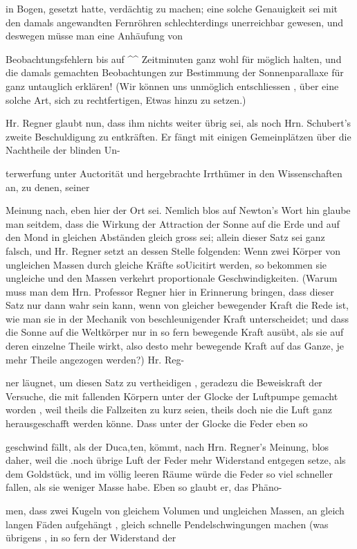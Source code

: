 \documentclass[10pt,a4paper]{article}
\begin{document}
in Bogen, gesetzt hatte, verdächtig zu machen; eine solche Genauigkeit sei mit den damals angewandten Fernröhren schlechterdings unerreichbar gewesen, und deswegen müsse man eine Anhäufung von

Beobachtungsfehlern bis auf \textasciicircum{}\textasciicircum{} Zeitminuten ganz wohl für möglich halten, und die damals gemachten Beobachtungen zur Bestimmung der Sonnenparallaxe für ganz untauglich erklären! (Wir können uns unmöglich entschliessen , über eine solche Art, sich zu rechtfertigen, Etwas hinzu zu setzen.)

Hr. Regner glaubt nun, dass ihm nichts weiter übrig sei, als noch Hrn. Schubert's zweite Beschuldigung zu entkräften. Er fängt mit einigen Gemeinplätzen über die Nachtheile der blinden Un-

terwerfung unter Auctorität und hergebrachte Irrthümer in den Wissenschaften an, zu denen, seiner

Meinung nach, eben hier der Ort sei. Nemlich blos auf Newton's Wort hin glaube man seitdem, dass die Wirkung der Attraction der Sonne auf die Erde und auf den Mond in gleichen Abständen gleich gross sei; allein dieser Satz sei ganz falsch, und Hr. Regner setzt an dessen Stelle folgenden: Wenn zwei Körper von ungleichen Massen durch gleiche Kräfte soUicitirt werden, so bekommen sie ungleiche und den Massen verkehrt proportionale Geschwindigkeiten. (Warum muss man dem Hrn. Professor Regner hier in Erinnerung bringen, dass dieser Satz nur dann wahr sein kann, wenn von gleicher bewegender Kraft die Rede ist, wie man sie in der Mechanik von beschleunigender Kraft unterscheidet; und dass die Sonne auf die Weltkörper nur in so fern bewegende Kraft ausübt, als sie auf deren einzelne Theile wirkt, also desto mehr bewegende Kraft auf das Ganze, je mehr Theile angezogen werden?) Hr. Reg-

ner läugnet, um diesen Satz zu vertheidigen , geradezu die Beweiskraft der Versuche, die mit fallenden Körpern unter der Glocke der Luftpumpe gemacht worden , weil theils die Fallzeiten zu kurz seien, theils doch nie die Luft ganz herausgeschafft werden könne. Dass unter der Glocke die Feder eben so

geschwind fällt, als der Duca,ten, kömmt, nach Hrn. Regner's Meinung, blos daher, weil die .noch übrige Luft der Feder mehr Widerstand entgegen setze, als dem Goldstück, und im völlig leeren Räume würde die Feder so viel schneller fallen, als sie weniger Masse habe. Eben so glaubt er, das Phäno-

men, dass zwei Kugeln von gleichem Volumen und ungleichen Massen, an gleich langen Fäden aufgehängt , gleich schnelle Pendelschwingungen machen (was übrigens , in so fern der Widerstand der
\end{document}
